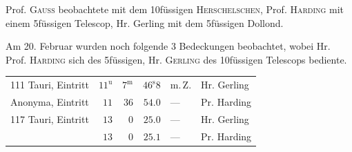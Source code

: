 \par\indent Prof. \textsc{Gauss} beobachtete mit dem 10füssigen \textsc{Herschelschen}, Prof. \textsc{Harding} mit einem 5füssigen Telescop, Hr. Gerling mit dem 5füssigen Dollond.

\par\indent Am 20. Februar wurden noch folgende 3 Bedeckungen beobachtet, wobei Hr. Prof. \textsc{Harding} sich des 5füssigen, Hr. \textsc{Gerling} des 10füssigen Telescops bediente.

\begin{center}\fontsize{9}{11}\selectfont\setlength{\tabcolsep}{2.5pt}\renewcommand{\arraystretch}{1.15}\begin{tabular}{lrrrll}
111 Tauri, Eintritt & $11^{\mathrm u}$ & $7^{\mathrm m}$ & $46^{\mathrm s}8$ & m.\,Z. & Hr. Gerling\\
Anonyma, Eintritt & $11$ & $36$ & $54.0$ & — & Pr. Harding\\
117 Tauri, Eintritt & $13$ & $0$ & $25.0$ & — & Hr. Gerling\\
 & $13$ & $0$ & $25.1$ & — & Pr. Harding\\
\end{tabular}\end{center}
